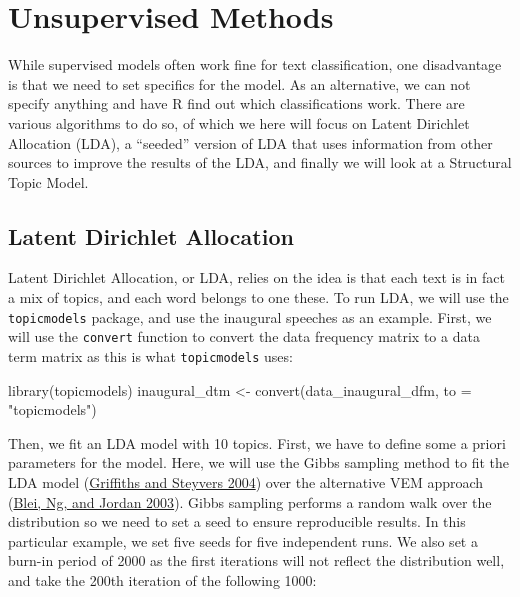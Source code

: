 \documentclass[
]{book}
\newenvironment{Shaded}{\begin{snugshade}}{\end{snugshade}}
\newcommand{\AttributeTok}[1]{\textcolor[rgb]{0.77,0.63,0.00}{#1}}
\newcommand{\FunctionTok}[1]{\textcolor[rgb]{0.00,0.00,0.00}{#1}}
\newcommand{\NormalTok}[1]{#1}
\newcommand{\OtherTok}[1]{\textcolor[rgb]{0.56,0.35,0.01}{#1}}
\newcommand{\StringTok}[1]{\textcolor[rgb]{0.31,0.60,0.02}{#1}}
\begin{document}
\hypertarget{unsupervised-methods}{%
\chapter{Unsupervised Methods}\label{unsupervised-methods}}

While supervised models often work fine for text classification, one disadvantage is that we need to set specifics for the model. As an alternative, we can not specify anything and have R find out which classifications work. There are various algorithms to do so, of which we here will focus on Latent Dirichlet Allocation (LDA), a ``seeded'' version of LDA that uses information from other sources to improve the results of the LDA, and finally we will look at a Structural Topic Model.

\hypertarget{latent-dirichlet-allocation}{%
\section{Latent Dirichlet Allocation}\label{latent-dirichlet-allocation}}

Latent Dirichlet Allocation, or LDA, relies on the idea is that each text is in fact a mix of topics, and each word belongs to one these. To run LDA, we will use the \texttt{topicmodels} package, and use the inaugural speeches as an example. First, we will use the \texttt{convert} function to convert the data frequency matrix to a data term matrix as this is what \texttt{topicmodels} uses:

\begin{Shaded}
\begin{Highlighting}[]
\FunctionTok{library}\NormalTok{(topicmodels)}
\NormalTok{inaugural\_dtm }\OtherTok{\textless{}{-}} \FunctionTok{convert}\NormalTok{(data\_inaugural\_dfm, }\AttributeTok{to =} \StringTok{"topicmodels"}\NormalTok{)}
\end{Highlighting}
\end{Shaded}

Then, we fit an LDA model with 10 topics. First, we have to define some a priori parameters for the model. Here, we will use the Gibbs sampling method to fit the LDA model (\protect\hyperlink{ref-Griffiths2004a}{Griffiths and Steyvers 2004}) over the alternative VEM approach (\protect\hyperlink{ref-Blei2003a}{Blei, Ng, and Jordan 2003}). Gibbs sampling performs a random walk over the distribution so we need to set a seed to ensure reproducible results. In this particular example, we set five seeds for five independent runs. We also set a burn-in period of 2000 as the first iterations will not reflect the distribution well, and take the 200th iteration of the following 1000:
\end{document}
